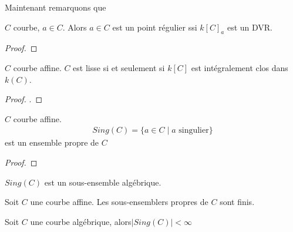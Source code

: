         Maintenant remarquons que
        \begin{theo}
            $C$ courbe, $a \in C$. Alors $a \in C$ est un point régulier ssi $k[C]_a$ est un DVR.
        \end{theo}
        \begin{proof}
        \end{proof}
        \begin{theo}
            $C$ courbe affine. $C$ est lisse si et seulement si $k[C]$ est intégralement clos dans $k(C)$.
        \end{theo}
        \begin{proof}
            .
        \end{proof}
        \begin{theo}
            $C$ courbe affine.
            \begin{align*}
                Sing(C) = \{a \in C \mid a \text{ singulier} \}
            \end{align*}
            est un ensemble propre de $C$
        \end{theo}
        \begin{proof}
        \end{proof}
        \begin{exo}
            $Sing(C)$ est un sous-ensemble algébrique.
        \end{exo}
        \begin{prop}
            \label{prop412}
            Soit $C$ une courbe affine. Les sous-ensemblers propres de $C$ sont finis.
        \end{prop}
        \begin{coro}
            Soit $C$ une courbe algébrique, alors$|Sing(C)| < \infty$
        \end{coro}
